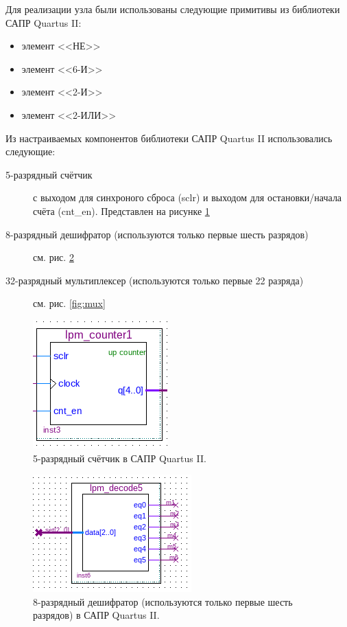 Для реализации узла были использованы следующие примитивы из библиотеки САПР Quartus II:
\begin{itemize}
\item элемент <<НЕ>>
\item элемент <<6-И>>
\item элемент <<2-И>>
\item элемент <<2-ИЛИ>>
\end{itemize}
Из настраиваемых компонентов библиотеки САПР Quartus II использовались следующие:
\begin{description}
\item[5-разрядный счётчик] с выходом для синхроного сброса (sclr) и выходом для остановки/начала счёта (cnt\_en). Представлен на рисунке \ref{fig:ct}
  
\item[8-разрядный дешифратор (используются только первые шесть разрядов)] см. рис. \ref{fig:dc}
\item[32-разрядный мультиплексер (используются только первые 22 разряда)] см. рис. \ref{fig:mux}
\end{description}

\begin{figure}
  \begin{center}
    \includegraphics[scale=1]{./ct.png}
    \caption{5-разрядный счётчик в САПР Quartus II.}
    \label{fig:ct}
  \end{center}
\end{figure}

\begin{figure}
  \begin{center}
    \includegraphics[scale=1]{./dc.png}
    \caption{8-разрядный дешифратор (используются только первые шесть разрядов) в САПР Quartus II.}
    \label{fig:dc}
  \end{center}
\end{figure}

